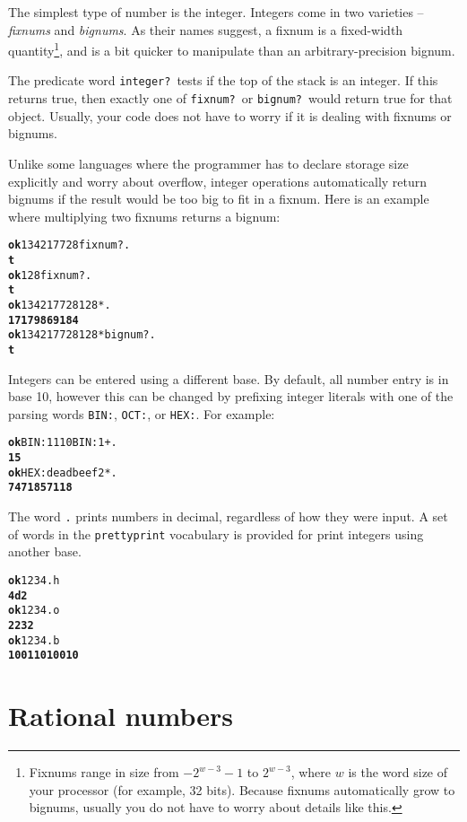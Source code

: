 \documentclass[english]{book}
\begin{document}
The simplest type of number is the integer. Integers come in two varieties -- \emph{fixnums} and \emph{bignums}. As their names suggest, a fixnum is a fixed-width quantity\footnote{Fixnums range in size from $-2^{w-3}-1$ to $2^{w-3}$, where $w$ is the word size of your processor (for example, 32 bits). Because fixnums automatically grow to bignums, usually you do not have to worry about details like this.}, and is a bit quicker to manipulate than an arbitrary-precision bignum.

The predicate word \texttt{integer?}~tests if the top of the stack is an integer. If this returns true, then exactly one of \texttt{fixnum?}~or \texttt{bignum?}~would return true for that object. Usually, your code does not have to worry if it is dealing with fixnums or bignums.

Unlike some languages where the programmer has to declare storage size explicitly and worry about overflow, integer operations automatically return bignums if the result would be too big to fit in a fixnum. Here is an example where multiplying two fixnums returns a bignum:

\begin{alltt}
\textbf{ok} 134217728 fixnum? .
\textbf{t}
\textbf{ok} 128 fixnum? .
\textbf{t}
\textbf{ok} 134217728 128 * .
\textbf{17179869184}
\textbf{ok} 134217728 128 * bignum? .
\textbf{t}
\end{alltt}

Integers can be entered using a different base. By default, all number entry is in base 10, however this can be changed by prefixing integer literals with one of the parsing words \texttt{BIN:}, \texttt{OCT:}, or \texttt{HEX:}. For example:

\begin{alltt}
\textbf{ok} BIN: 1110 BIN: 1 + .
\textbf{15}
\textbf{ok} HEX: deadbeef 2 * .
\textbf{7471857118}
\end{alltt}

The word \texttt{.} prints numbers in decimal, regardless of how they were input. A set of words in the \texttt{prettyprint} vocabulary is provided for print integers using another base.

\begin{alltt}
\textbf{ok} 1234 .h
\textbf{4d2}
\textbf{ok} 1234 .o
\textbf{2232}
\textbf{ok} 1234 .b
\textbf{10011010010}
\end{alltt}

\section{Rational numbers}
\end{document}
